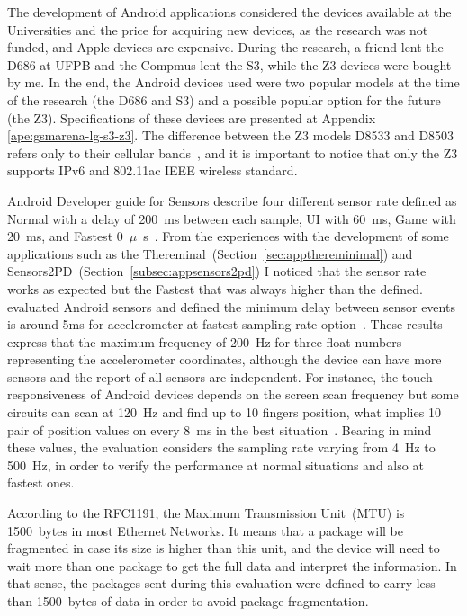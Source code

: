 The development of Android applications considered the devices available at the Universities and the price for acquiring new devices, as the research was not funded, and Apple devices are expensive.
During the research, a friend lent the D686 at UFPB and the Compmus lent the S3, while the Z3 devices were bought by me.
In the end, the Android devices used were two popular models at the time of the research (the D686 and S3) and a possible popular option for the future (the Z3).
Specifications of these devices are presented at Appendix \ref{ape:gsmarena-lg-s3-z3}.
The difference between the Z3 models D8533 and D8503 refers only to their cellular bands~\cite{Sony2017xperiaz3}, and it is important to notice that only the Z3 supports IPv6 and 802.11ac IEEE wireless standard.

Android Developer guide for Sensors describe four different sensor rate defined as Normal with a delay of 200~ms between each sample, UI with 60~ms, Game with 20~ms, and Fastest 0~$\mu$~s~\cite{Android2017sensorsoverview}.
From the experiences with the development of some applications such as the Thereminal~(Section~\ref{sec:appthereminimal}) and Sensors2PD~(Section~\ref{subsec:appsensors2pd}) I noticed that the sensor rate works as expected but the Fastest that was always higher than the defined.
 evaluated Android sensors and defined the minimum delay between sensor events is around 5ms for accelerometer at fastest sampling rate option~\cite{Ma2013experimental}.
These results express that the maximum frequency of 200~Hz for three float numbers representing the accelerometer coordinates, although the device can have more sensors and the report of all sensors are independent.
For instance, the touch responsiveness of Android devices depends on the screen scan frequency but some circuits can scan at 120~Hz and find up to 10 fingers position, what implies 10 pair of position values on every 8~ms in the best situation~\cite{Padre2017touchresponsiveness}.
Bearing in mind these values, the evaluation considers the sampling rate varying from 4~Hz to 500~Hz, in order to verify the performance at normal situations and also at fastest ones.  

According to the RFC1191, the Maximum Transmission Unit~(MTU) is 1500~bytes in most Ethernet Networks.
It means that a package will be fragmented in case its size is higher than this unit, and the device will need to wait more than one package to get the full data and interpret the information.
In that sense, the packages sent during this evaluation were defined to carry less than 1500~bytes of data in order to avoid package fragmentation.

